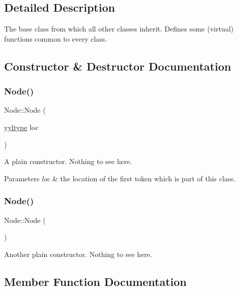 \subsection{Detailed Description}
The base class from which all other classes inherit. Defines some (virtual) functions common to every class. 

\subsection{Constructor \& Destructor Documentation}
\mbox{\label{class_node_ae1a193c43abc2eea6d7c12e8eff40312}} 
\subsubsection{\texorpdfstring{Node()}{Node()}\hspace{0.1cm}{\footnotesize\ttfamily [1/2]}}
{\footnotesize\ttfamily Node\+::\+Node (\begin{DoxyParamCaption}\item[{\hyperlink{structyyltype}{yyltype}}]{loc }\end{DoxyParamCaption})}

A plain constructor. Nothing to see here. 
\begin{DoxyParams}{Parameters}
{\em loc} & the location of the first token which is part of this class. \\
\hline
\end{DoxyParams}
\mbox{\label{class_node_ad7a34779cad45d997bfd6d3d8043c75f}} 
\subsubsection{\texorpdfstring{Node()}{Node()}\hspace{0.1cm}{\footnotesize\ttfamily [2/2]}}
{\footnotesize\ttfamily Node\+::\+Node (\begin{DoxyParamCaption}{ }\end{DoxyParamCaption})}

Another plain constructor. Nothing to see here. 

\subsection{Member Function Documentation}
\mbox{\label{class_node_a5f88d55c6f253a29def7ccc443d83d47}} 
